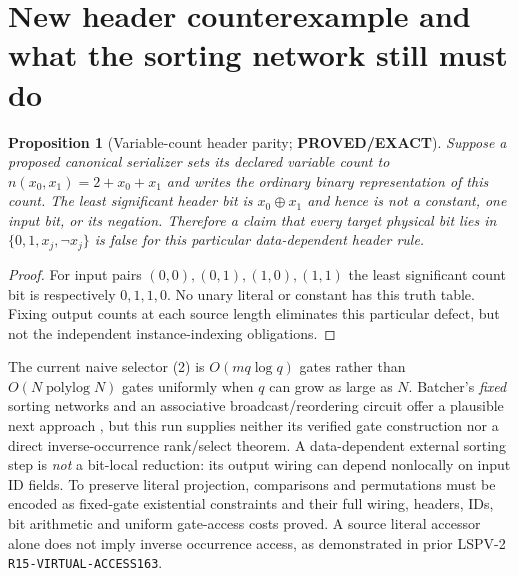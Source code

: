 \documentclass[11pt]{article}
\newtheorem{proposition}[theorem]{Proposition}
\begin{document}
\section{New header counterexample and what the sorting network still must do}
\begin{proposition}[Variable-count header parity; \textbf{PROVED/EXACT}]
Suppose a proposed canonical serializer sets its declared variable count to $n(x_0,x_1)=2+x_0+x_1$ and writes the ordinary binary representation of this count. The least significant header bit is $x_0\oplus x_1$ and hence is \emph{not} a constant, one input bit, or its negation. Therefore a claim that every target physical bit lies in $\{0,1,x_j,\neg x_j\}$ is false for this particular data-dependent header rule.
\end{proposition}
\begin{proof}
For input pairs $(0,0),(0,1),(1,0),(1,1)$ the least significant count bit is respectively $0,1,1,0$. No unary literal or constant has this truth table. Fixing output counts at each source length eliminates this particular defect, but not the independent instance-indexing obligations.
\end{proof}

The current naive selector (2) is $O(mq\log q)$ gates rather than $O(N\operatorname{polylog}N)$ gates uniformly when $q$ can grow as large as $N$. Batcher's \emph{fixed} sorting networks and an associative broadcast/reordering circuit offer a plausible next approach \cite{batcher}, but this run supplies neither its verified gate construction nor a direct inverse-occurrence rank/select theorem. A data-dependent external sorting step is \emph{not} a bit-local reduction: its output wiring can depend nonlocally on input ID fields. To preserve literal projection, comparisons and permutations must be encoded as fixed-gate existential constraints and their full wiring, headers, IDs, bit arithmetic and uniform gate-access costs proved. A source literal accessor alone does not imply inverse occurrence access, as demonstrated in prior LSPV-2 \texttt{R15-VIRTUAL-ACCESS163}.
\end{document}
